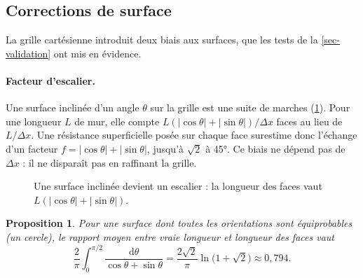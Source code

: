 \documentclass[11pt,a4paper]{article}
\newtheorem{proposition}{Proposition}
\theoremstyle{definition}
\theoremstyle{remark}
\newcommand{\dx}{\Delta x}
\begin{document}
\subsection{Corrections de surface}\label{sec-corrections}

La grille cartésienne introduit deux biais aux surfaces, que les tests de la
\cref{sec-validation} ont mis en évidence.

\paragraph{Facteur d'escalier.} Une surface inclinée d'un angle $\theta$ sur la
grille est une suite de marches (\cref{fig-escalier}). Pour une longueur $L$ de mur,
elle compte $L(|\cos\theta|+|\sin\theta|)/\dx$ faces au lieu de $L/\dx$. Une
résistance superficielle posée sur chaque face surestime donc l'échange d'un
facteur $f = |\cos\theta|+|\sin\theta|$, jusqu'à $\sqrt2$ à \ang{45}. Ce biais ne
dépend pas de $\dx$ : il ne disparaît pas en raffinant la grille.

\begin{figure}[H]
\centering
{}
\caption{Une surface inclinée devient un escalier : la longueur des faces vaut
$L(|\cos\theta|+|\sin\theta|)$.}
\label{fig-escalier}
\end{figure}

\begin{proposition}
Pour une surface dont toutes les orientations sont équiprobables (un cercle), le
rapport moyen entre vraie longueur et longueur des faces vaut
\[
\frac{2}{\pi}\int_0^{\pi/2}\frac{\mathrm{d}\theta}{\cos\theta+\sin\theta}
= \frac{2\sqrt2}{\pi}\ln\big(1+\sqrt2\big) \approx 0,794.
\]
\end{proposition}
\end{document}
